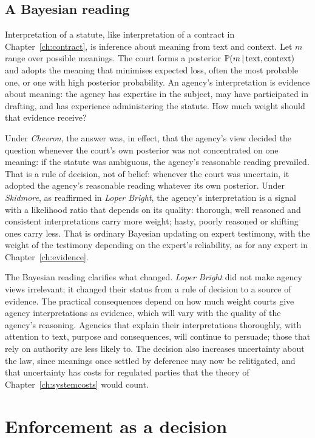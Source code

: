 \subsection{A Bayesian reading}

Interpretation of a statute, like interpretation of a contract in Chapter~\ref{ch:contract}, is inference about meaning from text and context. Let $m$ range over possible meanings. The court forms a posterior $\mathbb{P}(m\,\vert\,\text{text},\text{context})$ and adopts the meaning that minimises expected loss, often the most probable one, or one with high posterior probability. An agency's interpretation is evidence about meaning: the agency has expertise in the subject, may have participated in drafting, and has experience administering the statute. How much weight should that evidence receive?

Under \emph{Chevron}, the answer was, in effect, that the agency's view decided the question whenever the court's own posterior was not concentrated on one meaning: if the statute was ambiguous, the agency's reasonable reading prevailed. That is a rule of decision, not of belief: whenever the court was uncertain, it adopted the agency's reasonable reading whatever its own posterior. Under \emph{Skidmore}, as reaffirmed in \emph{Loper Bright}, the agency's interpretation is a signal with a likelihood ratio that depends on its quality: thorough, well reasoned and consistent interpretations carry more weight; hasty, poorly reasoned or shifting ones carry less. That is ordinary Bayesian updating on expert testimony, with the weight of the testimony depending on the expert's reliability, as for any expert in Chapter~\ref{ch:evidence}.

The Bayesian reading clarifies what changed. \emph{Loper Bright} did not make agency views irrelevant; it changed their status from a rule of decision to a source of evidence. The practical consequences depend on how much weight courts give agency interpretations as evidence, which will vary with the quality of the agency's reasoning. Agencies that explain their interpretations thoroughly, with attention to text, purpose and consequences, will continue to persuade; those that rely on authority are less likely to. The decision also increases uncertainty about the law, since meanings once settled by deference may now be relitigated, and that uncertainty has costs for regulated parties that the theory of Chapter~\ref{ch:systemcosts} would count.

\section{Enforcement as a decision}

